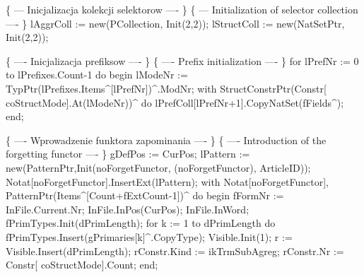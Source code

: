    \{ --- Inicjalizacja kolekcji selektorow ---- \}
   \{ --- Initialization of selector collection ---- \}
   lAggrColl := new(PCollection, Init(2,2));
   lStructColl := new(NatSetPtr, Init(2,2));
   
   \{ ---- Inicjalizacja prefiksow ---- \}
   \{ ---- Prefix initialization ---- \}
   for lPrefNr := 0 to lPrefixes.Count-1 do
   begin
      lModeNr :=  TypPtr(lPrefixes.Items^[lPrefNr])^.ModNr;
      with StructConstrPtr(Constr[ coStructMode].At(lModeNr))^ do
         lPrefColl[lPrefNr+1].CopyNatSet(fFields^);
   end;
   
   \{ ---- Wprowadzenie funktora zapominania ---- \}
   \{ ---- Introduction of the forgetting functor ---- \}
   gDefPos := CurPos;
   lPattern := new(PatternPtr,Init(noForgetFunctor, (noForgetFunctor),
                                   ArticleID));
   Notat[noForgetFunctor].InsertExt(lPattern);
   with Notat[noForgetFunctor], PatternPtr(Items^[Count+fExtCount-1])^ do
   begin
      fFormNr := InFile.Current.Nr; InFile.InPos(CurPos); InFile.InWord;
      fPrimTypes.Init(dPrimLength);
      for k := 1 to dPrimLength do
         fPrimTypes.Insert(gPrimaries[k]^.CopyType);
      Visible.Init(1); r := Visible.Insert(dPrimLength);
      rConstr.Kind := ikTrmSubAgreg;
      rConstr.Nr :=  Constr[ coStructMode].Count;
   end;
   
